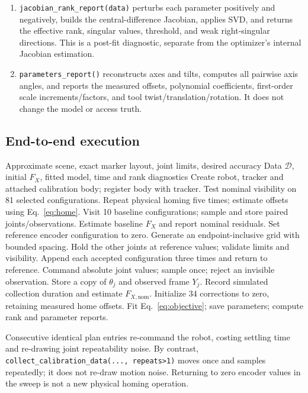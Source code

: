 \documentclass[11pt]{article}
\begin{document}
\begin{enumerate}
\item \texttt{jacobian\_rank\_report(data)} perturbs each parameter positively and negatively, builds the central-difference Jacobian, applies SVD, and returns the effective rank, singular values, threshold, and weak right-singular directions. This is a post-fit diagnostic, separate from the optimizer's internal Jacobian estimation.
\item \texttt{parameters\_report()} reconstructs axes and tilts, computes all pairwise axis angles, and reports the measured offsets, polynomial coefficients, first-order scale increments/factors, and tool twist/translation/rotation. It does not change the model or access truth.
\end{enumerate}

\subsection{End-to-end execution}

\begin{algorithm}[H]
\caption{Calibration workflow (Steps 1--8)}
\begin{algorithmic}[1]
\Require Approximate scene, exact marker layout, joint limits, desired accuracy
\Ensure Data $\mathcal D$, initial $F_X$, fitted model, time and rank diagnostics
\State Create robot, tracker and attached calibration body; register body with tracker.
\State Test nominal visibility on 81 selected configurations.
\State Repeat physical homing five times; estimate offsets using Eq.~\eqref{eq:home}.
\State Visit 10 baseline configurations; sample and store paired joints/observations.
\State Estimate baseline $F_X$ and report nominal residuals.
\State Set reference encoder configuration to zero.
 \State Generate an endpoint-inclusive grid with bounded spacing.
 \State Hold the other joints at reference values; validate limits and visibility.
 \State Append each accepted configuration three times and return to reference.
\EndFor
{}
 \State Command absolute joint values; sample once; reject an invisible observation.
 \State Store a copy of $\theta_j$ and observed frame $Y_j$.
\EndFor
\State Record simulated collection duration and estimate $F_{X,\mathrm{nom}}$.
\State Initialize 34 corrections to zero, retaining measured home offsets.
\State Fit Eq.~\eqref{eq:objective}; save parameters; compute rank and parameter reports.
\end{algorithmic}
\end{algorithm}
Consecutive identical plan entries re-command the robot, costing settling time and re-drawing joint repeatability noise. By contrast, \texttt{collect\_calibration\_data(..., repeats>1)} moves once and samples repeatedly; it does not re-draw motion noise. Returning to zero encoder values in the sweep is not a new physical homing operation.
\end{document}
